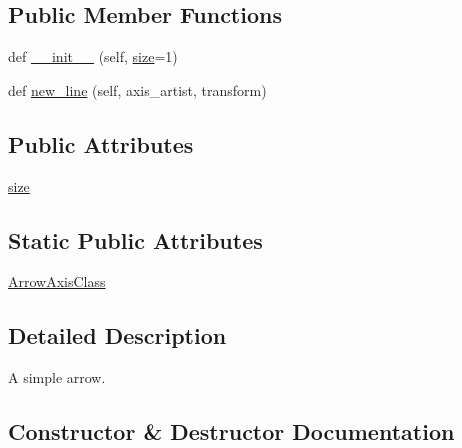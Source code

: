 \subsection*{Public Member Functions}
\begin{DoxyCompactItemize}
\item 
def \hyperlink{classaxisartist_1_1axisline__style_1_1AxislineStyle_1_1SimpleArrow_aac1ccc7413928f15455d6ad34a39dda4}{\+\_\+\+\_\+init\+\_\+\+\_\+} (self, \hyperlink{classaxisartist_1_1axisline__style_1_1AxislineStyle_1_1SimpleArrow_aac53d68a0228e3f14cb44f635ccb8084}{size}=1)
\item 
def \hyperlink{classaxisartist_1_1axisline__style_1_1AxislineStyle_1_1SimpleArrow_ab171009bc89cd6db04f3021bc98f6c1f}{new\+\_\+line} (self, axis\+\_\+artist, transform)
\end{DoxyCompactItemize}
\subsection*{Public Attributes}
\begin{DoxyCompactItemize}
\item 
\hyperlink{classaxisartist_1_1axisline__style_1_1AxislineStyle_1_1SimpleArrow_aac53d68a0228e3f14cb44f635ccb8084}{size}
\end{DoxyCompactItemize}
\subsection*{Static Public Attributes}
\begin{DoxyCompactItemize}
\item 
\hyperlink{classaxisartist_1_1axisline__style_1_1AxislineStyle_1_1SimpleArrow_adee4c17310692b9229beab26d9051c74}{Arrow\+Axis\+Class}
\end{DoxyCompactItemize}


\subsection{Detailed Description}
\begin{DoxyVerb}A simple arrow.
\end{DoxyVerb}
 

\subsection{Constructor \& Destructor Documentation}
\mbox{\label{classaxisartist_1_1axisline__style_1_1AxislineStyle_1_1SimpleArrow_aac1ccc7413928f15455d6ad34a39dda4}} 
